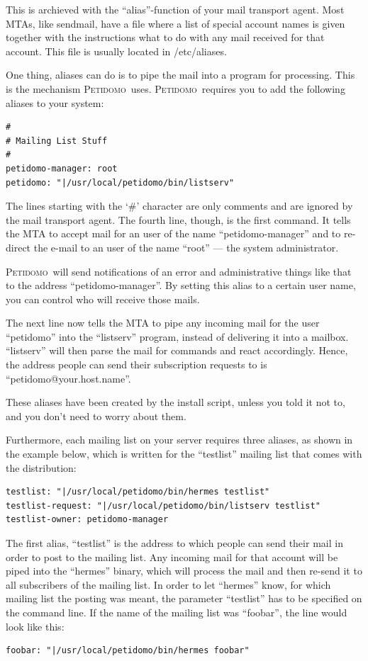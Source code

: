 \documentclass[a4paper,10pt]{scrreprt}
\newcommand{\Petidomo}{{\scshape Peti\-domo}}
\newcommand{\file}[1]{{\sf #1}}
\begin{document}
This is archieved with the ``alias''-function of your mail transport
agent. Most MTAs, like sendmail, have a file where a list of special
account names is given together with the instructions what to do with
any mail received for that account. This file is usually located in
\file{/etc/aliases}.

One thing, aliases can do is to pipe the mail into a program for
processing. This is the mechanism \Petidomo\ uses. \Petidomo\ requires
you to add the following aliases to your system:
\begin{verbatim}
#
# Mailing List Stuff
#
petidomo-manager: root
petidomo: "|/usr/local/petidomo/bin/listserv"
\end{verbatim}

The lines starting with the `\#' character are only comments and are
ignored by the mail transport agent. The fourth line, though, is the
first command. It tells the MTA to accept mail for an user of the name
``petidomo-manager'' and to re-direct the e-mail to an user of the
name ``root'' --- the system administrator.

\Petidomo\ will send notifications of an error and administrative
things like that to the address ``petidomo-manager''. By setting this
alias to a certain user name, you can control who will receive those
mails.

The next line now tells the MTA to pipe any incoming mail for the user
``petidomo'' into the ``listserv'' program, instead of delivering it
into a mailbox. ``listserv'' will then parse the mail for commands and
react accordingly. Hence, the address people can send their
subscription requests to is ``petidomo@your.host.name''.

These aliases have been created by the install script, unless you told
it not to, and you don't need to worry about them.

\bigskip

Furthermore, each mailing list on your server requires three aliases,
as shown in the example below, which is written for the ``testlist''
mailing list that comes with the distribution:
\begin{verbatim}
testlist: "|/usr/local/petidomo/bin/hermes testlist"
testlist-request: "|/usr/local/petidomo/bin/listserv testlist"
testlist-owner: petidomo-manager
\end{verbatim}

The first alias, ``testlist'' is the address to which people can send
their mail in order to post to the mailing list. Any incoming mail for
that account will be piped into the ``hermes'' binary, which will
process the mail and then re-send it to all subscribers of the mailing
list. In order to let ``hermes'' know, for which mailing list the
posting was meant, the parameter ``testlist'' has to be specified on
the command line. If the name of the mailing list was ``foobar'', the
line would look like this:
\begin{verbatim}
foobar: "|/usr/local/petidomo/bin/hermes foobar"
\end{verbatim}
\end{document}
